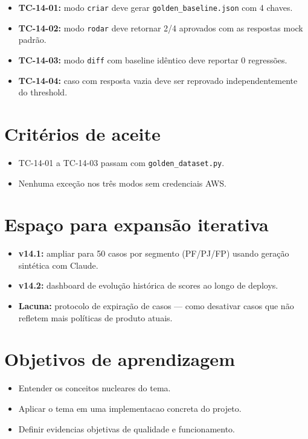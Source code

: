 \begin{itemize}[leftmargin=*]
  \item \textbf{TC-14-01:} modo \texttt{criar} deve gerar
        \texttt{golden\_baseline.json} com 4 chaves.
  \item \textbf{TC-14-02:} modo \texttt{rodar} deve retornar
        2/4 aprovados com as respostas mock padr\~ao.
  \item \textbf{TC-14-03:} modo \texttt{diff} com baseline
        id\^entico deve reportar 0 regress\~oes.
  \item \textbf{TC-14-04:} caso com resposta vazia deve ser
        reprovado independentemente do threshold.
\end{itemize}

\section{Crit\'erios de aceite}

\begin{itemize}[leftmargin=*]
  \item TC-14-01 a TC-14-03 passam com \texttt{golden\_dataset.py}.
  \item Nenhuma exce\c{c}\~ao nos tr\^es modos sem credenciais AWS.
\end{itemize}

\section{Espa\c{c}o para expans\~ao iterativa}

\begin{itemize}[leftmargin=*]
  \item \textbf{v14.1:} ampliar para 50 casos por segmento
        (PF/PJ/FP) usando gera\c{c}\~ao sint\'etica com Claude.
  \item \textbf{v14.2:} dashboard de evolu\c{c}\~ao hist\'orica
        de scores ao longo de deploys.
  \item \textbf{Lacuna:} protocolo de expira\c{c}\~ao de casos ---
        como desativar casos que n\~ao refletem mais pol\'iticas
        de produto atuais.
\end{itemize}

\section{Objetivos de aprendizagem}
\begin{itemize}[leftmargin=*]
  \item Entender os conceitos nucleares do tema.
  \item Aplicar o tema em uma implementacao concreta do projeto.
  \item Definir evidencias objetivas de qualidade e funcionamento.
\end{itemize}

